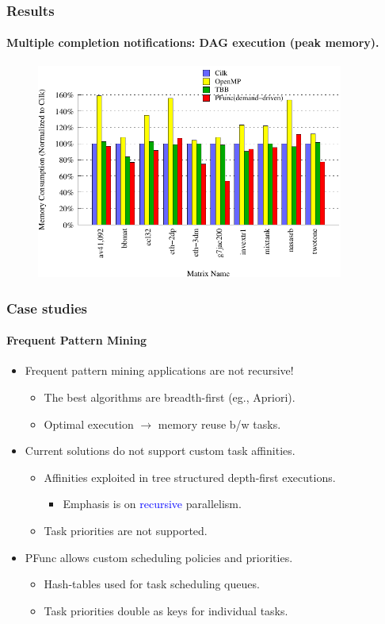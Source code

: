 \documentclass{beamer}
\begin{document}
\begin{frame}[fragile]
\frametitle{Results}
\framesubtitle{Multiple completion notifications: DAG execution (peak memory).}
\begin{figure}
\includegraphics[width=0.9\textwidth]{figs/dag_memory}
\label{fig:dag_memory}
\end{figure}
\end{frame}

\begin{frame}[fragile]
\frametitle{Case studies}
\framesubtitle{Frequent Pattern Mining}
\begin{itemize}
\item Frequent pattern mining applications are not recursive!
  \begin{itemize}
  \item The best algorithms are breadth-first (eg., Apriori).
  \item Optimal execution $\rightarrow{}$ memory reuse b/w tasks.
  \end{itemize}
\item Current solutions do not support custom task affinities.
  \begin{itemize}
  \item Affinities exploited in tree structured depth-first executions.
    \begin{itemize}
    \item Emphasis is on \textcolor{blue}{recursive} parallelism.
    \end{itemize}
  \item Task priorities are not supported.
  \end{itemize}
\item PFunc allows custom scheduling policies and priorities.
  \begin{itemize}
  \item Hash-tables used for task scheduling queues.
  \item Task priorities double as keys for individual tasks.
  \end{itemize}
\end{itemize}
\end{frame}
\end{document}
